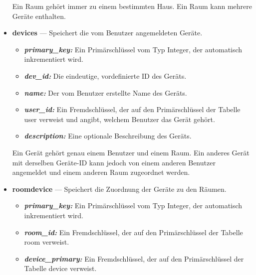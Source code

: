 \documentclass[12pt, letterpaper]{article}
\begin{document}
\begin{itemize}
\begin{itemize}
                        \end{itemize}
                        \par Ein Raum gehört immer zu einem bestimmten Haus. Ein Raum kann mehrere Geräte enthalten.
    \item \textbf{devices} --- Speichert die vom Benutzer angemeldeten Geräte. 
                        \begin{itemize}
                          \item \textit{\textbf{primary\_key:}} Ein Primärschlüssel vom Typ Integer, der automatisch inkrementiert wird.
                          \item \textit{\textbf{dev\_id:}} Die eindeutige, vordefinierte ID des Geräts. 
                          \item \textit{\textbf{name:}} Der vom Benutzer erstellte Name des Geräts.
                          \item \textit{\textbf{user\_id:}} Ein Fremdschlüssel, der auf den Primärschlüssel der Tabelle user verweist und angibt, welchem Benutzer das Gerät gehört.
                          \item \textit{\textbf{description:}} Eine optionale Beschreibung des Geräts.
                        \end{itemize}
                        Ein Gerät gehört genau einem Benutzer und einem Raum. Ein anderes Gerät mit derselben Geräte-ID kann jedoch von einem anderen Benutzer angemeldet und einem anderen Raum zugeordnet werden.
    \item \textbf{roomdevice} --- Speichert die Zuordnung der Geräte zu den Räumen. 
                        \begin{itemize}
                          \item \textit{\textbf{primary\_key:}} Ein Primärschlüssel vom Typ Integer, der automatisch inkrementiert wird.
                          \item \textit{\textbf{room\_id:}} Ein Fremdschlüssel, der auf den Primärschlüssel der Tabelle room verweist.
                          \item \textit{\textbf{device\_primary:}} Ein Fremdschlüssel, der auf den Primärschlüssel der Tabelle device verweist.
                        \end{itemize}
  \end{itemize}
\end{document}
